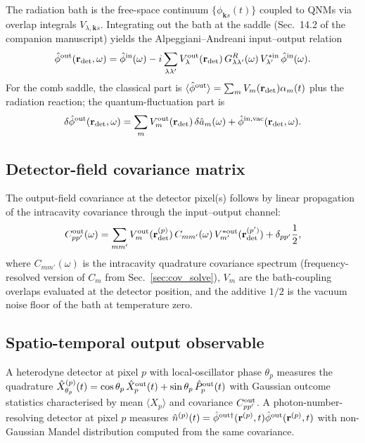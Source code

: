 \documentclass[11pt]{article}
\begin{document}
The radiation bath is the free-space continuum
$\{\phi_{\mathbf{k}s}(t)\}$ coupled to QNMs via overlap integrals
$V_{\lambda,\mathbf{k}s}$.  Integrating out the bath at the saddle
(Sec.~14.2 of the companion manuscript) yields the Alpeggiani--Andreani
input--output relation
\begin{equation}
  \hat\phi^{\rm out}(\mathbf{r}_{\rm det},\omega) =
  \hat\phi^{\rm in}(\omega)
  - i\sum_{\lambda\lambda'}V^{\rm out}_\lambda(\mathbf{r}_{\rm det})\,
    G^R_{\lambda\lambda'}(\omega)\,V^{*\rm in}_{\lambda'}\,
    \hat\phi^{\rm in}(\omega).
  \label{eq:io_AA}
\end{equation}
For the comb saddle, the classical part is
$\langle\hat\phi^{\rm out}\rangle = \sum_m V_m(\mathbf{r}_{\rm det})\alpha_m(t)$
plus the radiation reaction; the quantum-fluctuation part is
\begin{equation}
  \delta\hat\phi^{\rm out}(\mathbf{r}_{\rm det},\omega) =
  \sum_m V^{\rm out}_m(\mathbf{r}_{\rm det})\,\delta\hat a_m(\omega)
  + \hat\phi^{\rm in,vac}(\mathbf{r}_{\rm det},\omega).
\end{equation}

\subsection{Detector-field covariance matrix}

The output-field covariance at the detector pixel(s) follows by
linear propagation of the intracavity covariance through the
input--output channel:
\begin{equation}
  C^{\rm out}_{pp'}(\omega) =
  \sum_{mm'}V^{\rm out}_m(\mathbf{r}^{(p)}_{\rm det})\,
  C_{mm'}(\omega)\,V^{*\rm out}_{m'}(\mathbf{r}^{(p')}_{\rm det})
  + \delta_{pp'}\frac{1}{2},
  \label{eq:Cout}
\end{equation}
where $C_{mm'}(\omega)$ is the intracavity quadrature covariance
spectrum (frequency-resolved version of $C_m$ from
Sec.~\ref{sec:cov_solve}), $V_m$ are the bath-coupling overlaps
evaluated at the detector position, and the additive $1/2$ is the
vacuum noise floor of the bath at temperature zero.

\subsection{Spatio-temporal output observable}

A heterodyne detector at pixel $p$ with local-oscillator phase
$\theta_p$ measures the quadrature
$\hat X^{(p)}_{\theta_p}(t) = \cos\theta_p\,\hat X^{\rm out}_p(t)
+ \sin\theta_p\,\hat P^{\rm out}_p(t)$
with Gaussian outcome statistics characterised by
mean $\langle X_p\rangle$ and covariance $C^{\rm out}_{pp'}$.
A photon-number-resolving detector at pixel $p$ measures
$\hat n^{(p)}(t) = \hat\phi^{{\rm out}\dagger}(\mathbf{r}^{(p)},t)
\hat\phi^{\rm out}(\mathbf{r}^{(p)},t)$ with non-Gaussian Mandel
distribution computed from the same covariance.
\end{document}
